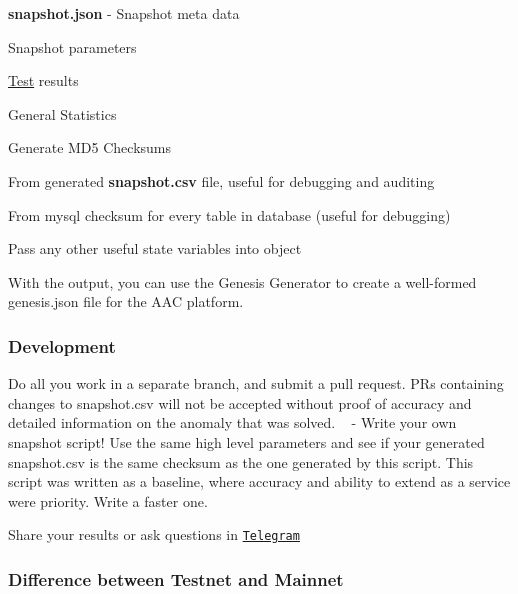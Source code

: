 {\bfseries snapshot.\+json} -\/ Snapshot meta data


\begin{DoxyEnumerate}
\item Snapshot parameters
\item \mbox{\hyperlink{struct_test}{Test}} results
\item General Statistics
\item Generate M\+D5 Checksums
\begin{DoxyEnumerate}
\item From generated {\bfseries snapshot.\+csv} file, useful for debugging and auditing
\item From mysql checksum for every table in database (useful for debugging)
\end{DoxyEnumerate}
\item Pass any other useful state variables into object
\end{DoxyEnumerate}

With the output, you can use the Genesis Generator to create a well-\/formed genesis.\+json file for the A\+AC platform.

\label{_snapshot-development}%
 \subsubsection*{Development}


\begin{DoxyItemize}
\item Do all you work in a separate branch, and submit a pull request. PR\textquotesingle{}s containing changes to snapshot.\+csv will not be accepted without proof of accuracy and detailed information on the anomaly that was solved. ~\newline
-\/ Write your own snapshot script! Use the same high level parameters and see if your generated snapshot.\+csv is the same checksum as the one generated by this script. This script was written as a baseline, where accuracy and ability to extend as a service were priority. Write a faster one.
\item Share your results or ask questions in \href{https://t.me/joinchat/GgxZkRDT3PF5tVFm9m06gw}{\tt Telegram}
\end{DoxyItemize}

\label{_snapshot-networks}%
 \subsubsection*{Difference between Testnet and Mainnet}

